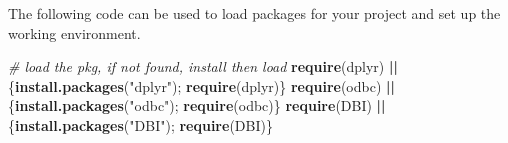 \documentclass[
  a4paper,
  twoside,
  openright]{book}
\newenvironment{Shaded}{\begin{snugshade}}{\end{snugshade}}
\newcommand{\CommentTok}[1]{\textcolor[rgb]{0.56,0.35,0.01}{\textit{#1}}}
\newcommand{\DecValTok}[1]{\textcolor[rgb]{0.00,0.00,0.81}{#1}}
\newcommand{\ErrorTok}[1]{\textcolor[rgb]{0.64,0.00,0.00}{\textbf{#1}}}
\newcommand{\FunctionTok}[1]{\textcolor[rgb]{0.13,0.29,0.53}{\textbf{#1}}}
\newcommand{\NormalTok}[1]{#1}
\newcommand{\OtherTok}[1]{\textcolor[rgb]{0.56,0.35,0.01}{#1}}
\newcommand{\SpecialCharTok}[1]{\textcolor[rgb]{0.81,0.36,0.00}{\textbf{#1}}}
\newcommand{\StringTok}[1]{\textcolor[rgb]{0.31,0.60,0.02}{#1}}
\theoremstyle{definition}
\theoremstyle{definition}
\theoremstyle{definition}
\theoremstyle{definition}
\theoremstyle{remark}
\begin{document}
\begin{Shaded}
\end{Shaded}

The following code can be used to load packages for your project and set up the working environment.

\begin{Shaded}
\begin{Highlighting}[]
\CommentTok{\# load the pkg, if not found, install then load}
\FunctionTok{require}\NormalTok{(dplyr) }\SpecialCharTok{||}\NormalTok{ \{}\FunctionTok{install.packages}\NormalTok{(}\StringTok{"dplyr"}\NormalTok{); }\FunctionTok{require}\NormalTok{(dplyr)\}}
\FunctionTok{require}\NormalTok{(odbc) }\SpecialCharTok{||}\NormalTok{ \{}\FunctionTok{install.packages}\NormalTok{(}\StringTok{"odbc"}\NormalTok{); }\FunctionTok{require}\NormalTok{(odbc)\}}
\FunctionTok{require}\NormalTok{(DBI) }\SpecialCharTok{||}\NormalTok{ \{}\FunctionTok{install.packages}\NormalTok{(}\StringTok{"DBI"}\NormalTok{); }\FunctionTok{require}\NormalTok{(DBI)\}}
\end{Highlighting}
\end{Shaded}
\end{document}
